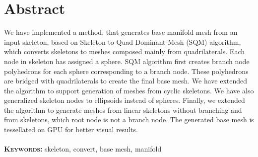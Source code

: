 \chapter{Abstract}
We have implemented a method, that generates base manifold mesh from an input skeleton, based on Skeleton to Quad Dominant Mesh (SQM) algorithm, which converts skeletons to meshes composed mainly from quadrilaterals.
Each node in skeleton has assigned a sphere.
SQM algorithm first creates branch node polyhedrons for each sphere corresponding to a branch node.
These polyhedrons are bridged with quadrilaterals to create the final base mesh.
We have extended the algorithm to support generation of meshes from cyclic skeletons.
We have also generalized skeleton nodes to ellipsoids instead of spheres.
Finally, we extended the algorithm to generate meshes from linear skeletons without branching and from skeletons, which root node is not a branch node.
The generated base mesh is tessellated on GPU for better visual results.
\\ \\
\textbf{\textsc{Keywords:}} skeleton, convert, base mesh, manifold

